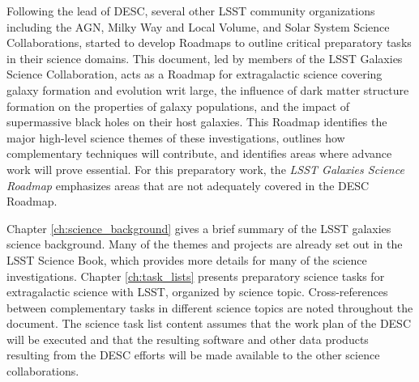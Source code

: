 {Following the lead of DESC, several other LSST community organizations 
including the AGN, Milky Way and Local Volume, and Solar System Science
Collaborations,
started to develop Roadmaps to outline critical preparatory tasks in
their science domains.
This document, led by members of the LSST Galaxies Science Collaboration, 
acts as a Roadmap for extragalactic science covering
galaxy formation and evolution writ large, the influence of dark matter structure
formation on the properties of galaxy populations, and the impact of supermassive
black holes on their host galaxies.
This Roadmap identifies the major high-level
science themes of these investigations, outlines how complementary techniques
will contribute, and identifies areas where advance work will prove essential. For this
preparatory work, the {\it LSST Galaxies Science Roadmap} emphasizes areas that are not adequately 
covered in the DESC Roadmap. 

Chapter \ref{ch:science_background} gives a brief summary of the LSST galaxies science background.
Many of the themes and projects are already set out in the LSST Science Book, 
which provides more details for many of the science investigations. 
Chapter \ref{ch:task_lists} presents preparatory science tasks for 
extragalactic science with LSST, organized by science topic.
Cross-references between complementary tasks in different science topics are
noted throughout the document.
The science task list content assumes that the work plan of the DESC will be executed
and that the resulting software and other data products resulting from the DESC
efforts will be made available to the other science collaborations.
}
\let\cleardoublepage\clearpage

